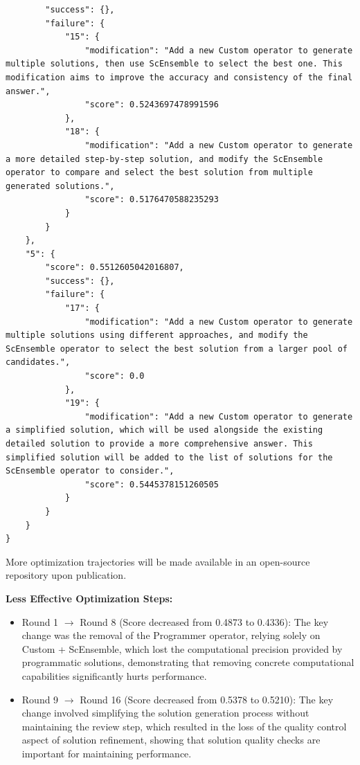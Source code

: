 \documentclass{article} %
\theoremstyle{plain}
\theoremstyle{definition}
\theoremstyle{remark}
\begin{document}
\begin{tcolorbox}
\begin{verbatim}
        "success": {},
        "failure": {
            "15": {
                "modification": "Add a new Custom operator to generate multiple solutions, then use ScEnsemble to select the best one. This modification aims to improve the accuracy and consistency of the final answer.",
                "score": 0.5243697478991596
            },
            "18": {
                "modification": "Add a new Custom operator to generate a more detailed step-by-step solution, and modify the ScEnsemble operator to compare and select the best solution from multiple generated solutions.",
                "score": 0.5176470588235293
            }
        }
    },
    "5": {
        "score": 0.5512605042016807,
        "success": {},
        "failure": {
            "17": {
                "modification": "Add a new Custom operator to generate multiple solutions using different approaches, and modify the ScEnsemble operator to select the best solution from a larger pool of candidates.",
                "score": 0.0
            },
            "19": {
                "modification": "Add a new Custom operator to generate a simplified solution, which will be used alongside the existing detailed solution to provide a more comprehensive answer. This simplified solution will be added to the list of solutions for the ScEnsemble operator to consider.",
                "score": 0.5445378151260505
            }
        }
    }
}
\end{verbatim}
\end{tcolorbox}
More optimization trajectories will be made available in an open-source repository upon publication.

\textbf{Less Effective Optimization Steps:}
\begin{itemize}[leftmargin=20pt]
    \item Round 1 $\rightarrow$ Round 8 (Score decreased from 0.4873 to 0.4336): The key change was the removal of the Programmer operator, relying solely on Custom + ScEnsemble, which lost the computational precision provided by programmatic solutions, demonstrating that removing concrete computational capabilities significantly hurts performance.
    
    \item Round 9 $\rightarrow$ Round 16 (Score decreased from 0.5378 to 0.5210): The key change involved simplifying the solution generation process without maintaining the review step, which resulted in the loss of the quality control aspect of solution refinement, showing that solution quality checks are important for maintaining performance.
\end{itemize}
\end{document}
